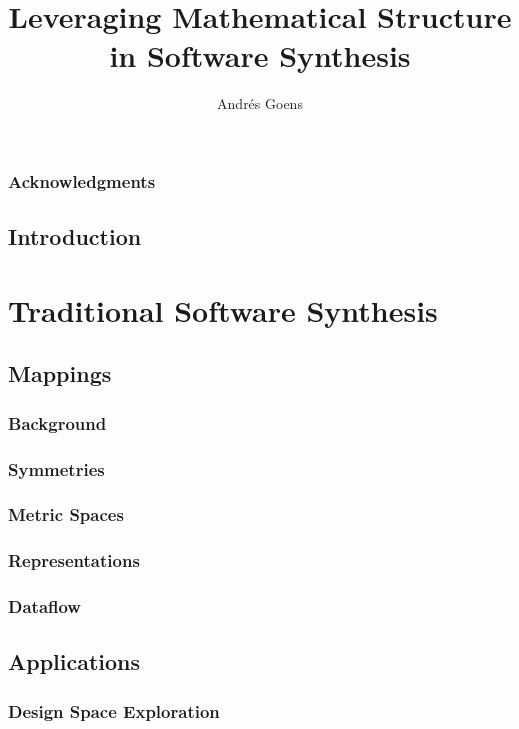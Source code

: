 \documentclass{report}
\title{Leveraging Mathematical Structure in Software Synthesis}
\author{Andr\'{e}s Goens}
\begin{document}
\date{}

\maketitle
\tableofcontents
\clearpage
\section*{Acknowledgments}


\chapter{Introduction}


\part{Traditional Software Synthesis}

\chapter{Mappings}

\section{Background}

\section{Symmetries}

\section{Metric Spaces}

\section{Representations}

\section{Dataflow}


\chapter{Applications}
\label{chap:mapping_applications}

\section{Design Space Exploration}

\end{document}
